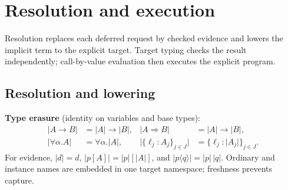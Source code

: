 \documentclass[10pt,a4paper]{article}
\newcommand{\iarg}[1]{\langle#1\rangle}
\newcommand{\erase}[1]{\lvert #1\rvert}
\begin{document}
\newpage
\section{Resolution and execution}
\label{sec:execution}
Resolution replaces each deferred request by checked evidence and lowers the
implicit term to the explicit target. Target typing checks the result
independently; call-by-value evaluation then executes the explicit program.

\subsection{Resolution and lowering}
\label{sec:lowering}
\textbf{Type erasure} (identity on variables and base types):
\[
\begin{aligned}
\erase{A\to B}&=\erase A\to\erase B,&
\erase{A\Rightarrow B}&=\erase A\to\erase B,\\
\erase{\forall\alpha.A}&=\forall\alpha.\erase A,&
\erase{\{\ell_j:A_j\}_{j\in J}}&=\{\ell_j:\erase{A_j}\}_{j\in J}.
\end{aligned}
\]
For evidence, $\erase d=d$, $\erase{p[A]}=\erase p[\erase A]$, and
$\erase{p\iarg{q}}=\erase p\,\erase q$. Ordinary and instance names are
embedded in one target namespace; freshness prevents capture.
\end{document}
